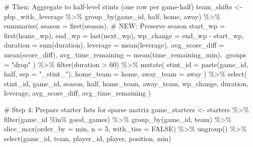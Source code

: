 \documentclass[
  letterpaper,
  DIV=11,
  numbers=noendperiod]{scrartcl}
\newenvironment{Shaded}{\begin{snugshade}}{\end{snugshade}}
\newcommand{\AttributeTok}[1]{\textcolor[rgb]{0.40,0.45,0.13}{#1}}
\newcommand{\CommentTok}[1]{\textcolor[rgb]{0.37,0.37,0.37}{#1}}
\newcommand{\ConstantTok}[1]{\textcolor[rgb]{0.56,0.35,0.01}{#1}}
\newcommand{\DecValTok}[1]{\textcolor[rgb]{0.68,0.00,0.00}{#1}}
\newcommand{\FunctionTok}[1]{\textcolor[rgb]{0.28,0.35,0.67}{#1}}
\newcommand{\NormalTok}[1]{\textcolor[rgb]{0.00,0.23,0.31}{#1}}
\newcommand{\OtherTok}[1]{\textcolor[rgb]{0.00,0.23,0.31}{#1}}
\newcommand{\SpecialCharTok}[1]{\textcolor[rgb]{0.37,0.37,0.37}{#1}}
\newcommand{\StringTok}[1]{\textcolor[rgb]{0.13,0.47,0.30}{#1}}
\begin{document}
\begin{Shaded}
\begin{Highlighting}[]
\CommentTok{\# Then: Aggregate to half{-}level stints (one row per game{-}half)}
\NormalTok{team\_shifts }\OtherTok{\textless{}{-}}\NormalTok{ pbp\_with\_leverage }\SpecialCharTok{\%\textgreater{}\%}
  \FunctionTok{group\_by}\NormalTok{(game\_id, half, home, away) }\SpecialCharTok{\%\textgreater{}\%}
  \FunctionTok{summarise}\NormalTok{(}
    \AttributeTok{season =} \FunctionTok{first}\NormalTok{(season), }\CommentTok{\# NEW: Preserve season}
    \AttributeTok{start\_wp =} \FunctionTok{first}\NormalTok{(home\_wp),}
    \AttributeTok{end\_wp =} \FunctionTok{last}\NormalTok{(next\_wp),}
    \AttributeTok{wp\_change =}\NormalTok{ end\_wp }\SpecialCharTok{{-}}\NormalTok{ start\_wp,}
    \AttributeTok{duration =} \FunctionTok{sum}\NormalTok{(duration),}
    \AttributeTok{leverage =} \FunctionTok{mean}\NormalTok{(leverage),}
    \AttributeTok{avg\_score\_diff =} \FunctionTok{mean}\NormalTok{(score\_diff),}
    \AttributeTok{avg\_time\_remaining =} \FunctionTok{mean}\NormalTok{(time\_remaining\_min),}
    \AttributeTok{.groups =} \StringTok{"drop"}
\NormalTok{  ) }\SpecialCharTok{\%\textgreater{}\%}
  \FunctionTok{filter}\NormalTok{(duration }\SpecialCharTok{\textgreater{}} \DecValTok{60}\NormalTok{) }\SpecialCharTok{\%\textgreater{}\%}
  \FunctionTok{mutate}\NormalTok{(}
    \AttributeTok{stint\_id =} \FunctionTok{paste}\NormalTok{(game\_id, half, }\AttributeTok{sep =} \StringTok{"\_stint\_"}\NormalTok{),}
    \AttributeTok{home\_team =}\NormalTok{ home,}
    \AttributeTok{away\_team =}\NormalTok{ away}
\NormalTok{  ) }\SpecialCharTok{\%\textgreater{}\%}
  \FunctionTok{select}\NormalTok{(}
\NormalTok{    stint\_id, game\_id, season, half, home\_team, away\_team,}
\NormalTok{    wp\_change, duration, leverage,}
\NormalTok{    avg\_score\_diff, avg\_time\_remaining}
\NormalTok{  )}


\CommentTok{\# Step 4: Prepare starter lists for sparse matrix}
\NormalTok{game\_starters }\OtherTok{\textless{}{-}}\NormalTok{ starters }\SpecialCharTok{\%\textgreater{}\%}
  \FunctionTok{filter}\NormalTok{(game\_id }\SpecialCharTok{\%in\%}\NormalTok{ good\_games) }\SpecialCharTok{\%\textgreater{}\%}
  \FunctionTok{group\_by}\NormalTok{(game\_id, team) }\SpecialCharTok{\%\textgreater{}\%}
  \FunctionTok{slice\_max}\NormalTok{(}\AttributeTok{order\_by =}\NormalTok{ min, }\AttributeTok{n =} \DecValTok{5}\NormalTok{, }\AttributeTok{with\_ties =} \ConstantTok{FALSE}\NormalTok{) }\SpecialCharTok{\%\textgreater{}\%}
  \FunctionTok{ungroup}\NormalTok{() }\SpecialCharTok{\%\textgreater{}\%}
  \FunctionTok{select}\NormalTok{(game\_id, team, player\_id, player, position, min)}


\end{Highlighting}
\end{Shaded}
\end{document}

